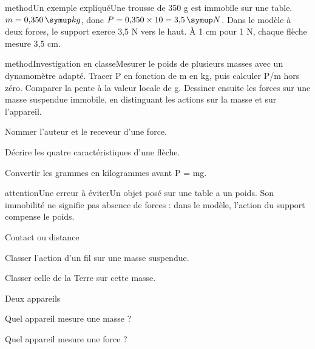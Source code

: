 \begin{pcEncadre}{method}{Un exemple expliqué}Une trousse de 350 g est immobile sur une table. $m=0{,}350\unite{kg}$, donc $P=0{,}350\times10=3{,}5\unite N$. Dans le modèle à deux forces, le support exerce 3,5 N vers le haut. À 1 cm pour 1 N, chaque flèche mesure 3,5 cm.\end{pcEncadre}
\label{activite-9}
\begin{pcEncadre}{method}{Investigation en classe}Mesurer le poids de plusieurs masses avec un dynamomètre adapté. Tracer P en fonction de m en kg, puis calculer P/m hors zéro. Comparer la pente à la valeur locale de g. Dessiner ensuite les forces sur une masse suspendue immobile, en distinguant les actions sur la masse et sur l’appareil.\end{pcEncadre}
\begin{questions}
\item Nommer l’auteur et le receveur d’une force.
\item Décrire les quatre caractéristiques d’une flèche.
\item Convertir les grammes en kilogrammes avant P = mg.
\end{questions}
\begin{pcEncadre}{attention}{Une erreur à éviter}Un objet posé sur une table a un poids. Son immobilité ne signifie pas absence de forces : dans le modèle, l’action du support compense le poids.\end{pcEncadre}
\pcGrille
\clearpage{}
\par\noindent\begin{minipage}{\linewidth}
\begin{exercice}[1]{Contact ou distance}
\begin{questions}
\item Classer l’action d’un fil sur une masse suspendue.
\item Classer celle de la Terre sur cette masse.
\end{questions}
\end{exercice}
\end{minipage}
\par\noindent\begin{minipage}{\linewidth}
\begin{exercice}[1]{Deux appareils}
\begin{questions}
\item Quel appareil mesure une masse ?
\item Quel appareil mesure une force ?
\end{questions}
\end{exercice}
\end{minipage}

